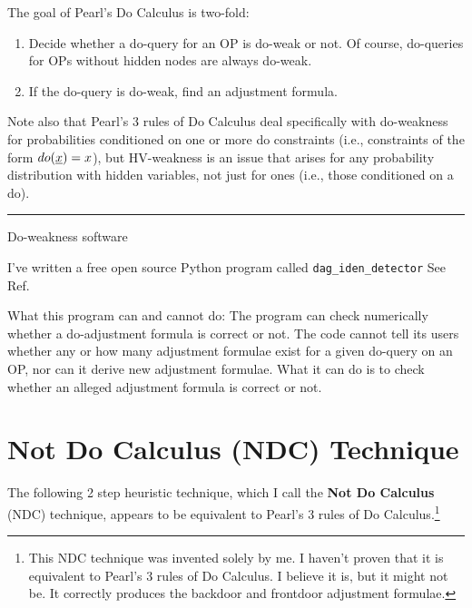 The goal of Pearl's Do Calculus is
two-fold:
\begin{enumerate}
\item 
Decide whether a do-query 
for an OP is do-weak or not.
Of course, do-queries
for OPs without hidden
nodes are always do-weak.

\item If the do-query is do-weak, find
an adjustment formula. 

\end{enumerate}

Note also that Pearl's 3 rules of Do Calculus
deal specifically
with do-weakness
for probabilities conditioned
on one or more do constraints (i.e., constraints of the form $do(\rvx)=x$),
but HV-weakness
is an issue that arises for any
probability distribution
with hidden variables, not
just for  ones
(i.e., those conditioned on a do).

\hrule
Do-weakness software

I've written 
a free open source Python program
called {\tt dag\_iden\_detector}
See Ref.\cite{dag-iden-detector}
 
What this program can and cannot do:
The program can check numerically whether a do-adjustment formula is correct or not. The code cannot tell its users whether any or how many adjustment formulae exist for a given 
do-query on an OP, nor can it derive new adjustment formulae. What it can do is to check whether an alleged adjustment formula is correct or not.




\section{Not Do Calculus (NDC) Technique}

The following 2 step heuristic technique,
which I call the {\bf Not Do Calculus} (NDC) technique, appears to be equivalent to Pearl's 3 rules of Do Calculus.\footnote{This NDC technique was invented solely by me. I haven't proven that it is equivalent to Pearl's 
3 rules of Do Calculus. I believe it is,
but it might not be. It 
correctly produces the backdoor and frontdoor adjustment formulae.}

